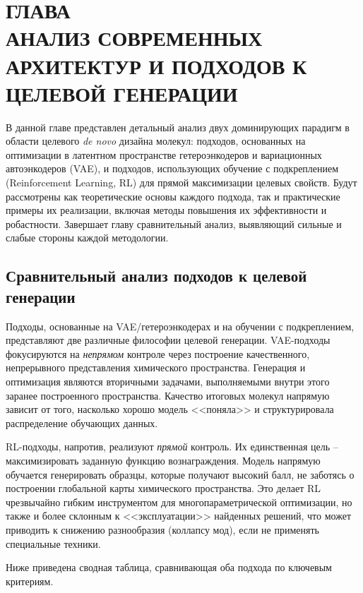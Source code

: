 \documentclass[../main.tex]{subfiles}
\begin{document}
\onlyinsubfile{
    \renewcommand{\contentsname}{ОГЛАВЛЕНИЕ}
    \setcounter{tocdepth}{3}
    \tableofcontents
}

\chapter*{\MakeUppercase{Глава \\ Анализ современных архитектур и подходов к целевой генерации}}\label{chapter:analysis}


В данной главе представлен детальный анализ двух доминирующих парадигм в области целевого \textit{de novo} дизайна молекул: подходов, основанных на оптимизации в латентном пространстве гетероэнкодеров и вариационных автоэнкодеров (VAE), и подходов, использующих обучение с подкреплением (Reinforcement Learning, RL) для прямой максимизации целевых свойств. Будут рассмотрены как теоретические основы каждого подхода, так и практические примеры их реализации, включая методы повышения их эффективности и робастности. Завершает главу сравнительный анализ, выявляющий сильные и слабые стороны каждой методологии.




\section{Сравнительный анализ подходов к целевой генерации}

Подходы, основанные на VAE/гетероэнкодерах и на обучении с подкреплением, представляют две различные философии целевой генерации. VAE-подходы фокусируются на \textit{непрямом} контроле через построение качественного, непрерывного представления химического пространства. Генерация и оптимизация являются вторичными задачами, выполняемыми внутри этого заранее построенного пространства. Качество итоговых молекул напрямую зависит от того, насколько хорошо модель <<поняла>> и структурировала распределение обучающих данных.

RL-подходы, напротив, реализуют \textit{прямой} контроль. Их единственная цель -- максимизировать заданную функцию вознаграждения. Модель напрямую обучается генерировать образцы, которые получают высокий балл, не заботясь о построении глобальной карты химического пространства. Это делает RL чрезвычайно гибким инструментом для многопараметрической оптимизации, но также и более склонным к <<эксплуатации>> найденных решений, что может приводить к снижению разнообразия (коллапсу мод), если не применять специальные техники.

Ниже приведена сводная таблица, сравнивающая оба подхода по ключевым критериям.

\small
\renewcommand{\arraystretch}{1.3}


\normalsize
\renewcommand{\arraystretch}{1.0}

\onlyinsubfile{
    \printbibliography[heading=bibintoc, title={Библиографический список}]
}
\end{document}
